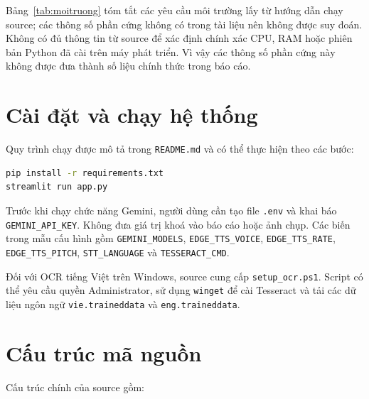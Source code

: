 Bảng~\ref{tab:moitruong} tóm tắt các yêu cầu môi trường lấy từ hướng dẫn chạy
source; các thông số phần cứng không có trong tài liệu nên không được suy đoán.
Không có đủ thông tin từ source để xác định chính xác CPU, RAM hoặc phiên bản
Python đã cài trên máy phát triển. Vì vậy các thông số phần cứng này không
được đưa thành số liệu chính thức trong báo cáo.

\section{Cài đặt và chạy hệ thống}

Quy trình chạy được mô tả trong \texttt{README.md} và có thể thực hiện theo các bước:

\begin{lstlisting}[language=bash, caption={Cài đặt thư viện và khởi chạy ứng dụng trên Windows.}]
pip install -r requirements.txt
streamlit run app.py
\end{lstlisting}

Trước khi chạy chức năng Gemini, người dùng cần tạo file \texttt{.env} và khai báo
\texttt{GEMINI\_API\_KEY}. Không đưa giá trị khoá vào báo cáo hoặc ảnh chụp.
Các biến trong mẫu cấu hình gồm \texttt{GEMINI\_MODELS}, \texttt{EDGE\_TTS\_VOICE},
\texttt{EDGE\_TTS\_RATE}, \texttt{EDGE\_TTS\_PITCH}, \texttt{STT\_LANGUAGE} và
\texttt{TESSERACT\_CMD}.

Đối với OCR tiếng Việt trên Windows, source cung cấp \texttt{setup\_ocr.ps1}. Script
có thể yêu cầu quyền Administrator, sử dụng \texttt{winget} để cài Tesseract và tải
các dữ liệu ngôn ngữ \texttt{vie.traineddata} và \texttt{eng.traineddata}.

\section{Cấu trúc mã nguồn}

Cấu trúc chính của source gồm:


